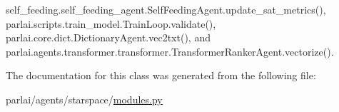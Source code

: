self\+\_\+feeding.\+self\+\_\+feeding\+\_\+agent.\+Self\+Feeding\+Agent.\+update\+\_\+sat\+\_\+metrics(), parlai.\+scripts.\+train\+\_\+model.\+Train\+Loop.\+validate(), parlai.\+core.\+dict.\+Dictionary\+Agent.\+vec2txt(), and parlai.\+agents.\+transformer.\+transformer.\+Transformer\+Ranker\+Agent.\+vectorize().



The documentation for this class was generated from the following file\+:\begin{DoxyCompactItemize}
\item 
parlai/agents/starspace/\hyperlink{parlai_2agents_2starspace_2modules_8py}{modules.\+py}\end{DoxyCompactItemize}
